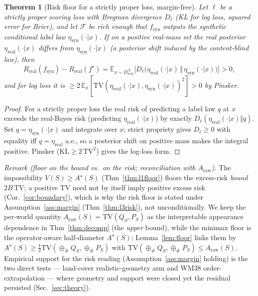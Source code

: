 \documentclass[11pt]{article}
\newtheorem{theorem}{Theorem}
\begin{document}
\begin{theorem}[Risk floor for a strictly proper loss, margin-free]\label{thm:l3prime}
Let $\ell$ be a strictly proper scoring loss with Bregman divergence $D_\ell$ (KL for log loss,
squared error for Brier), and let $\mathcal F$ be rich enough that $f_{\mathrm{syn}}$ outputs the
synthetic conditional label law $\eta_{\mathrm{syn}}(\cdot|x)$. If on a positive real-mass set the
real posterior $\eta_{\mathrm{real}}(\cdot|x)$ differs from $\eta_{\mathrm{syn}}(\cdot|x)$ (a
posterior shift induced by the content-blind law), then
\[
R_{\mathrm{real}}(f_{\mathrm{syn}})-R_{\mathrm{real}}(f^\star)
=\mathbb{E}_{x\sim D_{\mathrm{real}}^X}\big[D_\ell\big(\eta_{\mathrm{real}}(\cdot|x)\,\Vert\,\eta_{\mathrm{syn}}(\cdot|x)\big)\big]>0,
\]
and for log loss it is $\ge2\,\mathbb{E}_x[\mathrm{TV}(\eta_{\mathrm{real}}(\cdot|x),\eta_{\mathrm{syn}}(\cdot|x))^2]>0$ by Pinsker.
\end{theorem}
\begin{proof}
For a strictly proper loss the real risk of predicting a label law $q$ at $x$ exceeds the
real-Bayes risk (predicting $\eta_{\mathrm{real}}(\cdot|x)$) by exactly
$D_\ell(\eta_{\mathrm{real}}(\cdot|x)\Vert q)$. Set $q=\eta_{\mathrm{syn}}(\cdot|x)$ and integrate
over $x$; strict propriety gives $D_\ell\ge0$ with equality iff $q=\eta_{\mathrm{real}}$ a.e., so a
posterior shift on positive mass makes the integral positive. Pinsker
($\mathrm{KL}\ge2\,\mathrm{TV}^2$) gives the log-loss form.
\end{proof}

\emph{Remark (floor on the bound vs.\ on the risk; reconciliation with $A_{\mathrm{raw}}$).} The
impossibility $V(S)\ge A^\star(S)$ (Thm~\ref{thm:l1floor}) floors the excess-risk \emph{bound}
$2B\,\mathrm{TV}$; a positive TV need not by itself imply positive excess risk
(Cor.~\ref{cor:boundary}), which is why the risk floor is stated under Assumption~\ref{ass:margin}
(Thm~\ref{thm:l3risk}), not unconditionally. We keep the per-world quantity
$A_{\mathrm{raw}}(S)=\mathrm{TV}(Q_S,P_S)$ as the interpretable appearance dependence in
Thm~\ref{thm:decomp} (the \emph{upper} bound), while the minimax floor is the operator-aware
half-diameter $A^\star(S)$; Lemma~\ref{lem:floor} links them by
$A^\star(S)\ge\tfrac12\mathrm{TV}(\oplus_{\#}Q_S,\oplus_{\#}P_S)$ with
$\mathrm{TV}(\oplus_{\#}Q_S,\oplus_{\#}P_S)\le A_{\mathrm{raw}}(S)$. Empirical support for the risk
reading (Assumption~\ref{ass:margin} holding) is the two direct tests --- land-cover
realistic-geometry arm and WM38 order-extrapolation --- where geometry and support were closed yet
the residual persisted (Sec.~\ref{sec:theory}).
\end{document}
